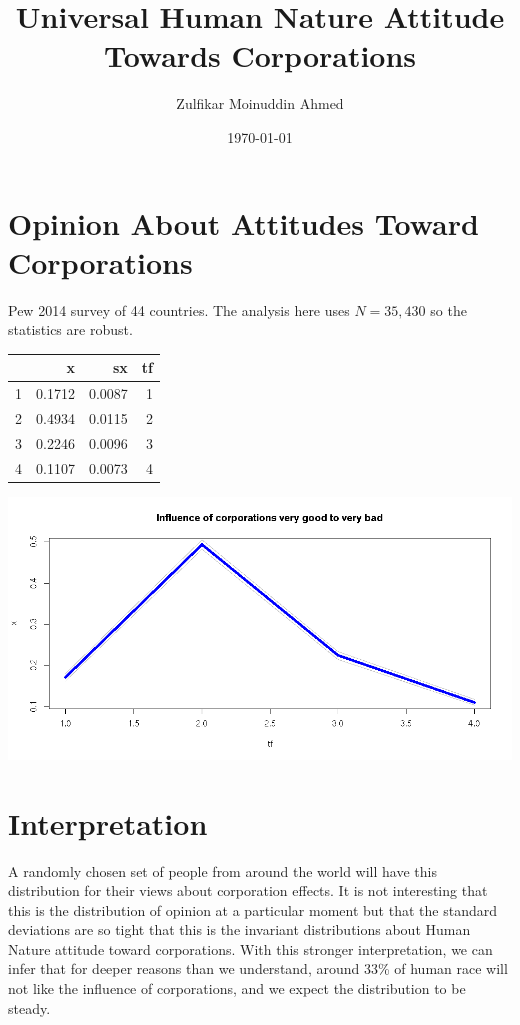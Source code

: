 \documentclass{amsart}
\title{Universal Human Nature Attitude Towards Corporations}
\author{Zulfikar Moinuddin Ahmed}
\date{\today}
\begin{document}
\maketitle

\section{Opinion About Attitudes Toward Corporations}

Pew 2014 survey of 44 countries.  The analysis here uses $N=35,430$ so the statistics are robust.

\begin{table}[ht]
\centering
\begin{tabular}{rrrr}
  \hline
 & x & sx & tf \\ 
  \hline
1 & 0.1712 & 0.0087 &  1 \\ 
  2 & 0.4934 & 0.0115 &  2 \\ 
  3 & 0.2246 & 0.0096 &  3 \\ 
  4 & 0.1107 & 0.0073 &  4 \\ 
   \hline
\end{tabular}
\end{table}

\includegraphics[scale=0.5]{corpop.png}

\section{Interpretation}

A randomly chosen set of people from around the world will have this distribution for their views about corporation effects.  It is not interesting that this is the distribution of opinion at a particular moment but that the standard deviations are so tight that this is the invariant distributions about Human Nature attitude toward corporations.  With this stronger interpretation, we can infer that for deeper reasons than we understand, around 33\% of human race will not like the influence of corporations, and we expect the distribution to be steady.  
\end{document}
